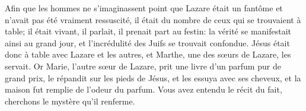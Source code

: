 Afin que les hommes ne s’imaginassent point que Lazare était un fantôme
	et n’avait pas été vraiment ressuscité,
	il était du nombre de ceux qui se trouvaient à table;
	il était vivant, il parlait, il prenait part au festin:
	la vérité se manifestait ainsi au grand jour,
	et l’incrédulité des Juifs se trouvait confondue.
Jésus était donc à table avec Lazare et les autres,
	et Marthe, une des sœurs de Lazare, les servait.
Or Marie, l’autre sœur de Lazare, prit une livre d’un parfum pur de grand prix,
	le répandit sur les pieds de Jésus, et les essuya avec ses cheveux,
	et la maison fut remplie de l’odeur du parfum.
Vous avez entendu le récit du fait,
	cherchons le mystère qu’il renferme.
